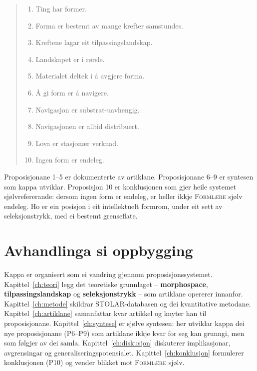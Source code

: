 \documentclass[12pt,a4paper,oneside]{report}
\begin{document}
\begin{quote}
\begin{enumerate}
  \item Ting har former.
  \item Forma er bestemt av mange krefter samstundes.
  \item Kreftene lagar eit tilpassingslandskap.
  \item Landskapet er i rørsle.
  \item Materialet deltek i å avgjere forma.
  \item Å gi form er å navigere.
  \item Navigasjon er substrat-uavhengig.
  \item Navigasjonen er alltid distribuert.
  \item Lova er stasjonær verknad.
  \item Ingen form er endeleg.
\end{enumerate}
\end{quote}

Proposisjonane 1--5 er dokumenterte av artiklane. Proposisjonane 6--9 er syntesen som kappa utviklar. Proposisjon 10 er konklusjonen som gjer heile systemet sjølvrefererande: dersom ingen form er endeleg, er heller ikkje \textsc{Formlære} sjølv endeleg. Ho er ein posisjon i eit intellektuelt formrom, under eit sett av seleksjonstrykk, med ei bestemt grenseflate.

\section{Avhandlinga si oppbygging}

Kappa er organisert som ei vandring gjennom proposisjonssystemet. Kapittel~\ref{ch:teori} legg det teoretiske grunnlaget -- \textbf{morphospace}, \textbf{tilpassingslandskap} og \textbf{seleksjonstrykk} -- som artiklane opererer innanfor. Kapittel~\ref{ch:metode} skildrar STOLAR-databasen og dei kvantitative metodane. Kapittel~\ref{ch:artiklane} samanfattar kvar artikkel og knyter han til proposisjonane. Kapittel~\ref{ch:syntese} er sjølve syntesen: her utviklar kappa dei nye proposisjonane (P6--P9) som artiklane ikkje kvar for seg kan grunngi, men som følgjer av dei samla. Kapittel~\ref{ch:diskusjon} diskuterer implikasjonar, avgrensingar og generaliseringspotensialet. Kapittel~\ref{ch:konklusjon} formulerer konklusjonen (P10) og vender blikket mot \textsc{Formlære} sjølv.

\end{document}
